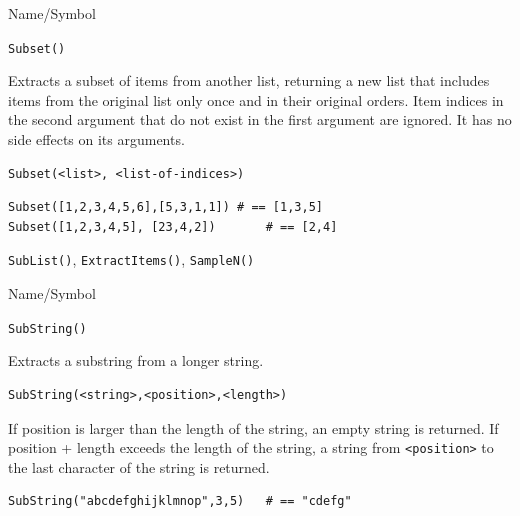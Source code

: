 \begin{desc}{Name/Symbol}
\item[Name/Symbol]  	\verb+Subset()+

\item[Description] Extracts a subset of items from another list,
  returning a new list that includes items from the original list only
  once and in their original orders.  Item indices in the second
  argument that do not exist in the first argument are ignored.  It
  has no side effects on its arguments.  

\item[Usage]       	
\begin{verbatim}
Subset(<list>, <list-of-indices>)
\end{verbatim}

\item[Example]     	
\begin{verbatim}
Subset([1,2,3,4,5,6],[5,3,1,1])	# == [1,3,5]
Subset([1,2,3,4,5], [23,4,2])		# == [2,4]
\end{verbatim}

\item[See Also]   	\verb+SubList()+, \verb+ExtractItems()+, \verb+SampleN()+
\end{desc}




\begin{desc}{Name/Symbol}
\item[Name/Symbol]  	\verb+SubString()+

\item[Description]  	Extracts a substring from a longer string.

\item[Usage]
\begin{verbatim}
SubString(<string>,<position>,<length>)
\end{verbatim}
  If position is larger than the length of the string, an empty string
  is returned.  If position + length exceeds the length of the string,
  a string from \verb+<position>+ to the last character of the string
  is returned.

\item[Example]
\begin{verbatim}
SubString("abcdefghijklmnop",3,5)	# == "cdefg"
\end{verbatim}

\item[See Also]	
\end{desc}







